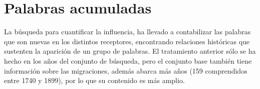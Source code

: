 \chapter{Palabras acumuladas}

La búsqueda para cuantificar la influencia, ha llevado a contabilizar las
palabras que son nuevas en los distintos receptores, encontrando relaciones históricas que sustenten la aparición de un grupo de palabras.  El tratamiento anterior sólo se ha hecho en los años del conjunto de búsqueda, pero  el conjunto base  también tiene información sobre las migraciones, además  abarca más años (159 comprendidos entre 1740 y 1899), por lo que su contenido es más amplio. 












